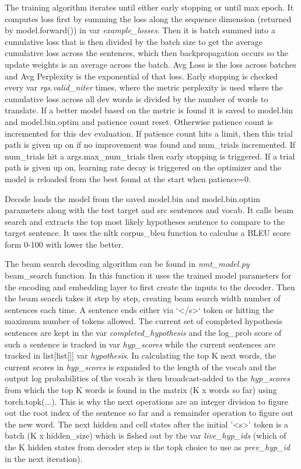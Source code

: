 \documentclass[11pt]{article}
\begin{document}
\bigskip

\noindent The training algorithm iterates until either early stopping or until max epoch. It computes loss first by summing the loss along the
sequence dimension (returned by model.forward()) in var \textit{example_losses}. Then it is batch summed into a cumulative loss that is then
divided by the batch size to get the average cumulative loss across the sentences, which then backpropagation occurs
so the update weights is an average across the batch. Avg Loss is the loss across batches and Avg Perplexity is the exponential of that loss. 
Early stopping is checked every var \textit{rgs.valid\_niter} times, where the metric perplexity is used where the cumulative loss across all
dev words is divided by the number of words to translate. If a better model based on the metric is found it is saved to model.bin and model.bin.optim
and patience count reset. Otherwise patience count is incremented for this dev evaluation. If patience count hits a limit, then this trial path is given up
on if no improvement was found and num_trials incremented. If num_trials hit a args.max\_num\_trials then early stopping is triggered. If a
trial path is given up on, learning rate decay is triggered on the optimizer and the model is reloaded from the best found at the start when patience=0.

\bigskip

\noindent Decode loads the model from the saved model.bin and model.bin.optim parameters along with the test target and src sentences and
vocab. It calls beam search and extracts the top most likely hypotheses sentence to compare to the target sentence. It uses the nltk corpus_bleu
function to calculus a BLEU score form 0-100 with lower the better. 

\bigskip

\noindent The beam search decoding algorithm can be found in \textit{nmt\_model.py} beam_search function. In this function it uses the trained
model parameters for the encoding and embedding layer to first create the inputs to the decoder. Then the beam search takes it step by step,
creating beam search width number of sentences each time. A sentence ends either via `</s>` token or hitting the maximum number of tokens
allowed. The current set of completed hypothesis sentences are kept in the var \textit{completed\_hypothesis} and the log\_prob score of such a
sentence is tracked in var \textit{hyp_scores} while the current sentences are tracked in list[list[]] var \textit{hypothesis}. In calculating the top K
next words, the current scores in \textit{hyp\_scores} is expanded to the length of the vocab and the output log probabilities of the vocab is then
broadcast-added to the \textit{hyp\_scores} from which the top K words is found in the matrix (K x words so far) using torch.topk(...). This is why
the next operations are an integer division to figure out the root index of the sentence so far and a remainder operation to figure out the new word.
The next hidden and cell states after the initial '<s>' token is a batch (K x hidden\_size) which is fished out by the var \textit{live\_hyp\_ids} (which
of the K hidden states from decoder step is the topk choice to use as \textit{prev\_hyp\_id} in the next iteration). 
\end{document}
